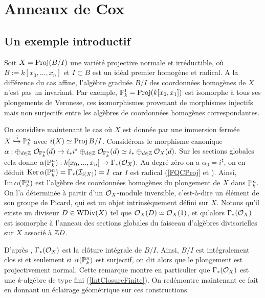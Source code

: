 \chapter{Anneaux de Cox}

\section{Un exemple introductif}
\label{ExIntroCox}
Soit $X=\operatorname{Proj}(B/I)$ une variété projective normale et irréductible, où $B:=k[x_0,...,x_n]$ et $I\subset B$ est un idéal premier homogène et radical. A la différence du cas affine, l'algèbre graduée $B/I$ des coordonnées homogènes de $X$ n'est pas un invariant. Par exemple, $\mathbb{P}^1_k=\operatorname{Proj}(k[x_0,x_1])$ est isomorphe à tous ses plongements de Veronese, ces isomorphismes provenant de morphismes injectifs mais non surjectifs entre les algèbres de coordonnées homogènes correspondantes.

On considère maintenant le cas où $X$ est donnée par une immersion fermée $X\xhookrightarrow{i}\mathbb{P}^n_k $ avec $i(X)\simeq \operatorname{Proj} B/I$. Considérons le morphisme canonique $\alpha: \oplus_{d\in\mathbb{Z}}\,\,\mathcal{O}_{\mathbb{P}^n_k}(d)\rightarrow i_*i^*\oplus_{d\in \mathbb{Z}}\mathcal{O}_{\mathbb{P}^n_k}(d)\simeq i_*\oplus_{d\in \mathbb{Z}}\mathcal{O}_X(d)$. Sur les sections globales cela donne $\alpha(\mathbb{P}^n_k): k[x_0,...,x_n]\rightarrow \Gamma_*(\mathcal{O}_X)$. Au degré zéro on a $\alpha_0=i^\sharp$, on en déduit $\operatorname{Ker} \alpha(\mathbb{P}^n_k)=\Gamma_*(\mathcal{I} _{i(X)})=I$ car $I$ est radical (\ref{FQCProj} et \cite[ex II.5.10]{Hartshorne}). Ainsi, $\operatorname{Im} \alpha(\mathbb{P}^n_k)$ est l'algèbre des coordonnées homogènes du plongement de $X$ dans $\mathbb{P}_k^n$. On l'a déterminée à partir d'un $\mathcal{O}_X$-module inversible, c'est-à-dire un élément de son groupe de Picard, qui est un objet intrinsèquement défini sur $X$. Notons qu'il existe un diviseur $D\in \operatorname{WDiv}(X)$ tel que $\mathcal{O}_X(D)\simeq\mathcal{O}_X(1)$, et qu'alors $\Gamma_*(\mathcal{O}_X)$ est isomorphe à l'anneau des sections globales du faisceau d'algèbres divisorielles sur $X$ associé à $\mathbb{Z} D$.

D'après \cite[ex II.5.14]{Hartshorne} , $\Gamma_*(\mathcal{O}_X)$ est la clôture intégrale de $B/I$. Ainsi, $B/I$ est intégralement clos si et seulement si $\alpha(\mathbb{P}^n_k)$ est surjectif, on dit alors que le plongement est projectivement normal. Cette remarque montre en particulier que $\Gamma_*(\mathcal{O}_X)$ est une $k$-algèbre de type fini (\ref{IntClosureFinite}). On redémontre maintenant ce fait en donnant un éclairage géométrique sur ces constructions. 

